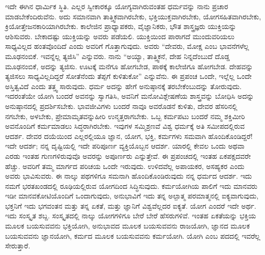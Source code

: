ಇದೇ ಈಗಿನ ಧಾರ್ಮಿಕ ಸ್ಥಿತಿ. ಎಲ್ಲರ ಸ್ವೀಕಾರಕ್ಕೂ ಯೋಗ್ಯವಾಗಿರುವಂತಹ ಧರ್ಮವನ್ನು ನಾನು ಪ್ರಚಾರ ಮಾಡಬೇಕೆಂದಿರುವೆನು. ಅದು ಸಮಾನವಾಗಿ ತಾತ್ತ್ವಿಕವಾಗಿರಬೇಕು, ಭಕ್ತಿಯುಕ್ತವಾಗಿರಬೇಕು, ಯೋಗಸಹಿತವಾಗಿರಬೇಕು, ಕ್ರಿಯೋತ್ತೇಜನಕಾರಿಯಾಗಿರಬೇಕು. ಕಾಲೇಜಿನ ಪ್ರಾಧ್ಯಾಪಕರು, ವೈಜ್ಞಾನಿಕರು, ಭೌತ ಶಾಸ್ತ್ರಜ್ಞರು ಯುಕ್ತಿಯನ್ನು ಆಶಿಸುವರು. ಬೇಕಾದಷ್ಟು ಯುಕ್ತಿಯನ್ನು ಅವರು ಪಡೆಯಲಿ. ಯುಕ್ತಿಯಿಂದ ಪಾರಾಗದೆ ಮುಂದುವರಿಯಲು ಸಾಧ್ಯವಿಲ್ಲದ ಹಂತವೊಂದಿದೆ ಎಂದು ಅವರಿಗೆ ಗೊತ್ತಾಗುವುದು. ಅವರು “ದೇವರು, ಮೋಕ್ಷ ಎಂಬ ಭಾವನೆಗಳೆಲ್ಲ ಮೂಢನಂಬಿಕೆ. ಇವನ್ನೆಲ್ಲ ತ್ಯಜಿಸಿ” ಎನ್ನುವರು. ನಾನು “ಅಯ್ಯಾ, ತಾತ್ತ್ವಿಕನೆ, ದೇಹ ನಿನ್ನದೆಂಬುದೆ ದೊಡ್ಡ ಮೂಢನಂಬಿಕೆ, ಅದನ್ನು ತ್ಯಜಿಸು. ಊಟಕ್ಕೆ ಮನೆಗೂ ಹೋಗಬೇಡ, ಪಾಠಕ್ಕೆ ಕಾಲೇಜಿಗೂ ಹೋಗಬೇಡ. ದೇಹವನ್ನು ತ್ಯಜಿಸಲು ಸಾಧ್ಯವಿಲ್ಲದಿದ್ದರೆ ಸೋತೆನೆಂದು ತೆಪ್ಪಗೆ ಕುಳಿತುಕೋ” ಎನ್ನುವೆನು. ಈ ಪ್ರಪಂಚ ಒಂದೇ, ಇಲ್ಲೆಲ್ಲ ಒಂದೇ ಅಸ್ತಿತ್ವವಿದೆ ಎಂದು ತತ್ತ್ವ ಸಾರುವುದು. ಧರ್ಮ ಅದನ್ನು ಹೇಗೆ ಅನುಷ್ಠಾನಕ್ಕೆ ತರಬೇಕೆಂಬುದನ್ನು ತೋರುವುದು. ಇದರಂತೆಯೇ ಯೋಗಿ ಬಂದರೆ ಅವನನ್ನು ಸ್ವಾಗತಿಸಿ, ಅವನಿಗೆ ಮನೋವಿಶ್ಲೇಷಣೆಯ ಶಾಸ್ತ್ರವನ್ನು ಬೋಧಿಸಿ ಅದನ್ನು ಅನುಷ್ಠಾನದಲ್ಲಿ ಪ್ರದರ್ಶಿಸಬೇಕು. ಭಾವಜೀವಿಗಳು ಬಂದರೆ ನಾವೂ ಅವರೊಡನೆ ಕುಳಿತು, ದೇವರ ಹೆಸರಿನಲ್ಲಿ ನಗಬೇಕು, ಅಳಬೇಕು, ಪ್ರೇಮಾಮೃತವನ್ನು\break ಹೀರಿ ಉನ್ಮತ್ತರಾಗಬೇಕು. ಒಬ್ಬ ಕರ್ಮಪಟು ಬಂದರೆ ನಮ್ಮ ಶಕ್ತಿಮೀರಿ ಅವನೊಂದಿಗೆ ಕರ್ಮಮಾಡಲು ಸಿದ್ಧರಾಗಿರಬೇಕು. ಇವುಗಳ ಸಮ್ಮಿಶ್ರಣವೆ ವಿಶ್ವ ಧರ್ಮಕ್ಕೆ ಅತಿ ಸಮೀಪದಲ್ಲಿರುವ ಆದರ್ಶ. ದೇವರ ದಯೆಯಿಂದ ಎಲ್ಲರಲ್ಲಿಯೂ ಜ್ಞಾನ, ಯೋಗ, ಭಕ್ತಿ, ಕರ್ಮಗಳು ಸಮವಾಗಿ ಹೊಂದಿಕೊಂಡಿದ್ದರೆ! ಇದೇ ಆದರ್ಶ; ನನ್ನ ದೃಷ್ಟಿಯಲ್ಲಿ ಇದೇ ಪರಿಪೂರ್ಣ ವ್ಯಕ್ತಿಯೊಬ್ಬನ ಆದರ್ಶ. ಯಾರಲ್ಲಿ ಕೇವಲ ಒಂದು ಅಥವಾ ಎರಡು ಇಂತಹ ಗುಣಗಳಿರುವುವೊ ಅವರನ್ನು ಅಪೂರ್ಣರು ಎನ್ನುತ್ತೇವೆ. ಈ ಪ್ರಪಂಚದಲ್ಲಿ ಇಂತಹ ಏಕಪಕ್ಷದವರೇ ಹೆಚ್ಚು. ಅವರಿಗೆ ತಮ್ಮ ಮಾರ್ಗದ ಪರಿಚಯ ಒಂದೇ ಇರುವುದು. ಉಳಿದವೆಲ್ಲ ಅಪಾಯಕರ, ಅಸಹ್ಯಕರ ಎಂದು ಅವರು ಭಾವಿಸುವರು. ಈ ನಾಲ್ಕು ಪಥಗಳಿಗೂ ಸಮನಾಗಿ ಹೊಂದಿಕೊಂಡಿರುವುದು ನನ್ನ ಧರ್ಮದ ಆದರ್ಶ. ಇದು ನಮಗೆ ಭರತಖಂಡದಲ್ಲಿ ರೂಢಿಯಲ್ಲಿರುವ ಯೋಗದಿಂದ ಸಿದ್ಧಿಸುವುದು. ಕರ್ಮಯೋಗಿಯ ಪಾಲಿಗೆ ಇದು ಮಾನವರು ಇಡೀ ಮಾನವಕೋಟಿಯೊಂದಿಗೆ ಒಂದಾಗುವುದು, ಅನುಭಾವಿಗೆ ಇದು ತನ್ನ ಅಲ್ಪಾತ್ಮ ಪರಮಾತ್ಮನಲ್ಲಿ ಐಕ್ಯವಾಗುವುದು, ಭಕ್ತನಿಗೆ ಇದು ಭಗವಂತನ ಮತ್ತು ತನ್ನ ಏಕತೆ, ಮತ್ತು ಜ್ಞಾನಿಗೆ ವಿಶ್ವವೆಲ್ಲದರ ಐಕ್ಯತೆ. ಯೋಗ ಎಂದರೆ ಇದೇ ಅರ್ಥ. ಇದು ಸಂಸ್ಕೃತ ಶಬ್ದ. ಸಂಸ್ಕೃತದಲ್ಲಿ ನಾಲ್ಕು ಯೋಗಗಳಿಗೂ ಬೇರೆ ಬೇರೆ ಹೆಸರುಗಳಿವೆ. ಇಂತಹ ಏಕತೆಯನ್ನು ಭಕ್ತಿಯ ಮೂಲಕ ಬಯಸುವವನು ಭಕ್ತಿಯೋಗಿ, ಅನುಭಾವದ ಮೂಲಕ ಬಯಸುವವನು ರಾಜಯೋಗಿ, ಜ್ಞಾನದ ಮೂಲಕ ಬಯಸುವವನು ಜ್ಞಾನಯೋಗಿ, ಕರ್ಮದ ಮೂಲಕ ಬಯಸುವವನು ಕರ್ಮಯೋಗಿ. ಯೋಗಿ ಎಂಬ ಪದದಲ್ಲಿ ಇವರೆಲ್ಲ ಸೇರುತ್ತಾರೆ.

